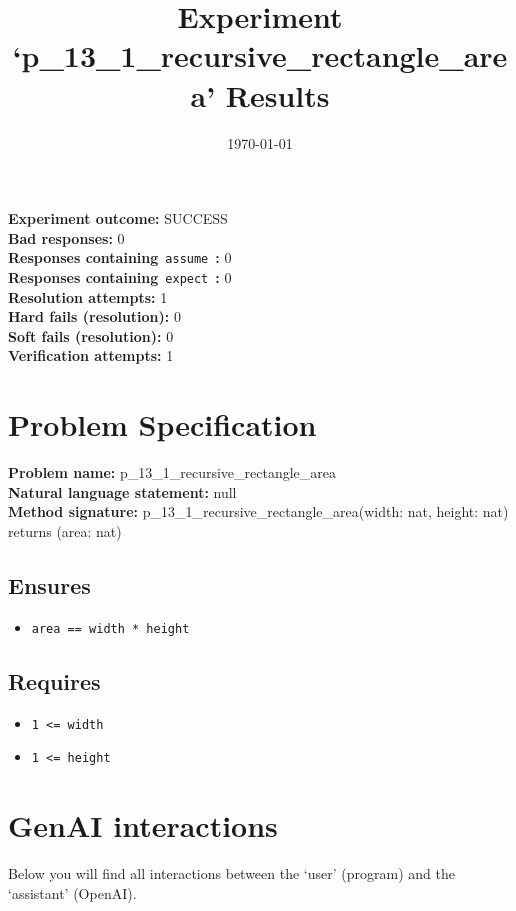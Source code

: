 \documentclass{article}
\begin{document}
\title{Experiment `p\_13\_1\_recursive\_rectangle\_area' Results}
\author{\today}
\date{}
\maketitle
\textbf{Experiment outcome: }SUCCESS
\\\textbf{Bad responses: }0
\\\textbf{Responses containing}~\texttt{assume}~\textbf{: }0
\\\textbf{Responses containing}~\texttt{expect}~\textbf{: }0
\\\textbf{Resolution attempts: }1
\\\textbf{Hard fails (resolution): }0
\\\textbf{Soft fails (resolution): }0
\\\textbf{Verification attempts: }1
\section*{Problem Specification}
\textbf{Problem name: }p\_13\_1\_recursive\_rectangle\_area
\\\textbf{Natural language statement: }null
\\\textbf{Method signature: }p\_13\_1\_recursive\_rectangle\_area(width: nat, height: nat) returns (area: nat)
\subsection*{Ensures}
\begin{itemize}
\item \texttt{area == width * height}
\end{itemize}
\subsection*{Requires}
\begin{itemize}
\item \texttt{1 <= width}
\item \texttt{1 <= height}
\end{itemize}
\clearpage
\section*{GenAI interactions}
Below you will find all interactions between the `user' (program) and the `assistant' (OpenAI).
\end{document}
